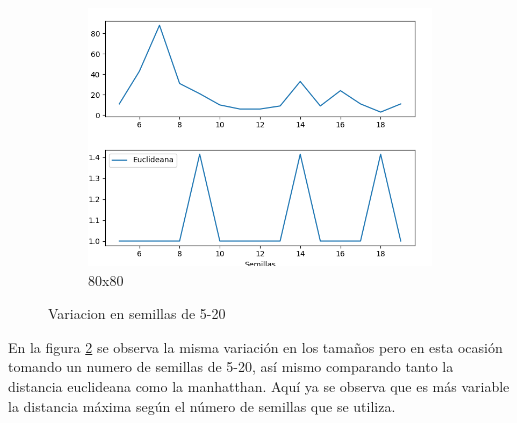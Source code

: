 \documentclass{article}
\begin{document}
\begin{figure}[H]
\begin{subfigure}[b]{0.7\linewidth}
        \end{subfigure}
        \begin{subfigure}[b]{0.7\linewidth}
           \includegraphics[width=\linewidth]{80x80-5-20.png}
           \caption{80x80}
           \label{fig:westminster_aerea}
        \end{subfigure}
        \caption{Variacion en semillas de 5-20}
        \label{f3}
\end{figure}

En la figura \ref{f3} se observa la misma variaci\'on en los tama\~nos pero en esta ocasi\'on tomando un numero de semillas de 5-20, as\'i mismo comparando tanto la distancia euclideana como la manhatthan. Aqu\'i ya se observa que es m\'as variable la distancia m\'axima seg\'un el n\'umero de semillas que se utiliza. 
\end{document}
